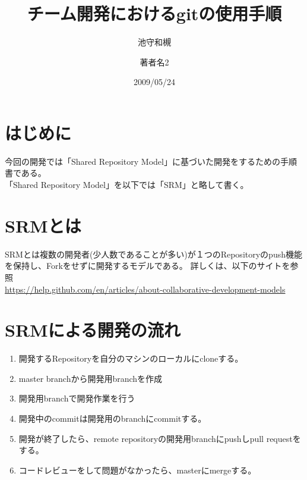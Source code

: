 \documentclass[dvipdfmx]{jsarticle}
\title {チーム開発におけるgitの使用手順}
\author{池守和槻 \and 著者名2}
\date{2009/05/24}
\begin{document}
  \maketitle
  \section{はじめに}
    今回の開発では「Shared Repository Model」に基づいた開発をするための手順書である。\\
    「Shared Repository Model」を以下では「SRM」と略して書く。\\


  \section{SRMとは}
    SRMとは複数の開発者(少人数であることが多い)が１つのRepositoryのpush機能を保持し、Forkをせずに開発するモデルである。
    詳しくは、以下のサイトを参照 \\
    \url{https://help.github.com/en/articles/about-collaborative-development-models}

  \section{SRMによる開発の流れ}
    \begin{enumerate}
      \item 開発するRepositoryを自分のマシンのローカルにcloneする。
      \item master branchから開発用branchを作成
      \item 開発用branchで開発作業を行う
      \item 開発中のcommitは開発用のbranchにcommitする。
      \item 開発が終了したら、remote repositoryの開発用branchにpushしpull requestをする。
      \item コードレビューをして問題がなかったら、masterにmergeする。
    \end{enumerate}
\end{document}
